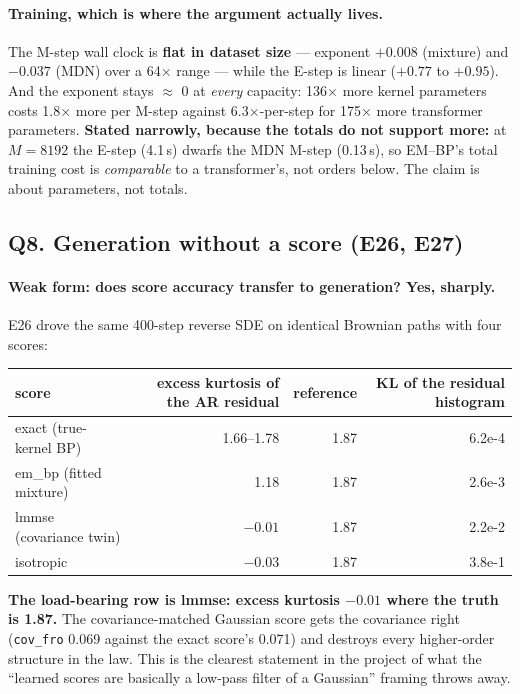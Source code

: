 \documentclass[10pt,a4paper]{article}
\newcommand{\nseq}{M}
\newcommand{\code}[1]{\texttt{\small #1}}
\newcommand{\st}[1]{\textbf{#1}}
\begin{document}
\paragraph{Training, which is where the argument actually lives.} The M-step wall clock is
\st{flat in dataset size} --- exponent $+0.008$ (mixture) and $-0.037$ (MDN) over a 64$\times$
range --- while the E-step is linear ($+0.77$ to $+0.95$). And the exponent stays $\approx$ 0
at \emph{every} capacity: 136$\times$ more kernel parameters costs 1.8$\times$ more per M-step
against 6.3$\times$-per-step for 175$\times$ more transformer parameters. \st{Stated narrowly,
because the totals do not support more:} at $\nseq=8192$ the E-step (4.1\,s) dwarfs the MDN
M-step (0.13\,s), so EM--BP's total training cost is \emph{comparable} to a transformer's, not
orders below. The claim is about parameters, not totals.

\subsection{Q8. Generation without a score (E26, E27)}

\paragraph{Weak form: does score accuracy transfer to generation? Yes, sharply.}
E26 drove the same 400-step reverse SDE on identical Brownian paths with four scores:

\medskip
\noindent\begin{tabular}{@{}l rrr@{}}
\toprule
score & excess kurtosis of the AR residual & reference & KL of the residual histogram \\
\midrule
exact (true-kernel BP) & 1.66--1.78 & 1.87 & 6.2e-4 \\
em\_bp (fitted mixture) & 1.18 & 1.87 & 2.6e-3 \\
lmmse (covariance twin) & \st{$-0.01$} & 1.87 & 2.2e-2 \\
isotropic & $-0.03$ & 1.87 & 3.8e-1 \\
\bottomrule
\end{tabular}

\medskip
\st{The load-bearing row is lmmse: excess kurtosis $-0.01$ where the truth is 1.87.} The
covariance-matched Gaussian score gets the covariance right (\code{cov\_fro} 0.069 against the
exact score's 0.071) and destroys every higher-order structure in the law. This is the clearest
statement in the project of what the ``learned scores are basically a low-pass filter of a
Gaussian'' framing throws away.
\end{document}
